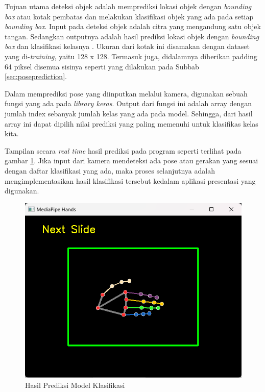 Tujuan utama deteksi objek adalah memprediksi lokasi objek dengan \emph{bounding box} atau kotak pembatas dan melakukan klasifikasi objek yang ada pada setiap \emph{bounding box}. Input pada deteksi objek adalah citra yang mengandung satu objek tangan. Sedangkan outputnya adalah hasil prediksi lokasi objek dengan \emph{bounding box} dan klasifikasi kelasnya \parencite{MElgendy}. Ukuran dari kotak ini disamakan dengan dataset yang di-\emph{training}, yaitu 128 x 128. Termasuk juga, didalamnya diberikan padding 64 piksel disemua sisinya seperti yang dilakukan pada Subbab \ref{sec:poseprediction}.

Dalam memprediksi pose yang diinputkan melalui kamera, digunakan sebuah fungsi yang ada pada \emph{library keras}. Output dari fungsi ini adalah array dengan jumlah index sebanyak jumlah kelas yang ada pada model. Sehingga, dari hasil array ini dapat dipilih nilai prediksi yang paling memenuhi untuk klasifikas kelas kita. 

Tampilan secara \emph{real time} hasil prediksi pada program seperti terlihat pada gambar \ref{fig:hasilprediksimodelklasifikasi}. Jika input dari kamera mendeteksi ada pose atau gerakan yang sesuai dengan daftar klasifikasi yang ada, maka proses selanjutnya adalah mengimplementasikan hasil klasifikasi tersebut kedalam aplikasi presentasi yang digunakan.

\begin{figure}[ht]
  \centering
  \includegraphics[scale=0.6]{gambar/hasil-prediksi-model-klasifikasi.png}
  \caption{Hasil Prediksi Model Klasifikasi}
  \label{fig:hasilprediksimodelklasifikasi}
\end{figure}

